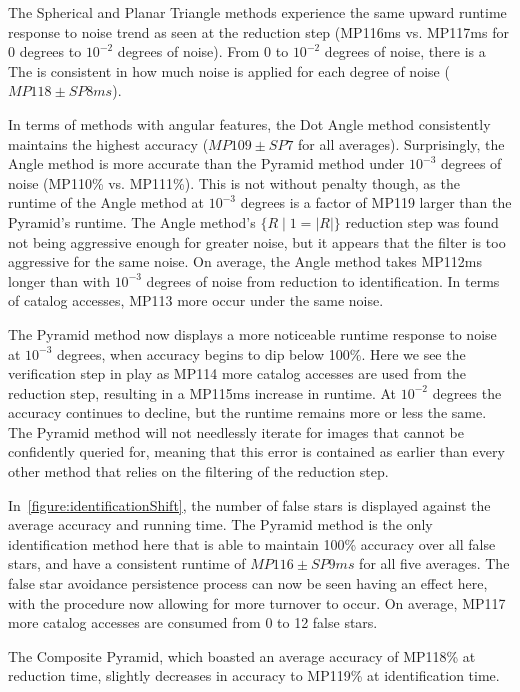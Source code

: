The Spherical and Planar Triangle methods experience the same upward runtime response to noise trend as seen at the
reduction step (MP116ms vs. MP117ms for 0 degrees to $10^{-2}$ degrees of noise).
From 0 to $10^{-2}$ degrees of noise, there is a
The  is consistent in how much noise is applied for each degree of noise ($MP118 \pm SP8ms$).

In terms of methods with angular features, the Dot Angle method consistently maintains the highest accuracy
($MP109 \pm SP7$ for all averages).
Surprisingly, the Angle method is more accurate than the Pyramid method under $10^{-3}$ degrees
of noise (MP110\% vs. MP111\%).
This is not without penalty though, as the runtime of the Angle method at $10^{-3}$ degrees is a factor of
MP119 larger than the Pyramid's runtime.
The Angle method's $\{ R \mid 1 = |R| \}$ reduction step was found not being aggressive enough for greater noise,
but it appears that the  filter is too aggressive for the same noise.
On average, the Angle method takes MP112ms longer than with $10^{-3}$ degrees of noise from reduction to
identification.
In terms of catalog accesses, MP113 more occur under the same noise.

The Pyramid method now displays a more noticeable runtime response to noise at $10^{-3}$ degrees, when accuracy
begins to dip below 100\%.
Here we see the  verification step in play as MP114 more catalog accesses are used from the reduction
step, resulting in a MP115ms increase in runtime.
At $10^{-2}$ degrees the accuracy continues to decline, but the runtime remains more or less the same.
The Pyramid method will not needlessly iterate for images that cannot be confidently queried for, meaning that this
error is contained as earlier than every other method that relies on the filtering of the reduction step.

In~\autoref{figure:identificationShift}, the number of false stars is displayed against the average accuracy and
running time.
The Pyramid method is the only identification method here that is able to maintain 100\% accuracy over all false stars,
and have a consistent runtime of $MP116 \pm SP9ms$ for all five averages.
The false star avoidance persistence process can now be seen having an effect here, with the 
procedure now allowing for more turnover to occur.
On average, MP117 more catalog accesses are consumed from 0 to 12 false stars.

The Composite Pyramid, which boasted an average accuracy of MP118\% at reduction time, slightly decreases in accuracy
to MP119\% at identification time.

